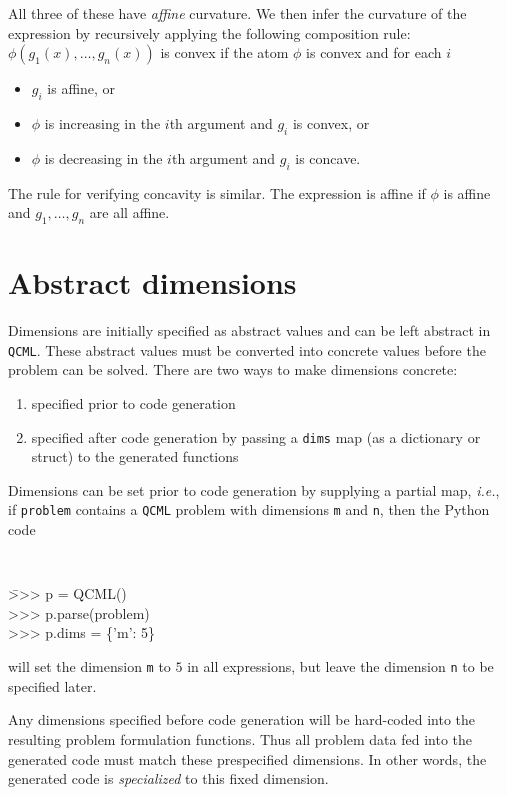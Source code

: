 \documentclass[11pt]{article}
\def\qcml{\texttt{QCML}\xspace}
\newcommand{\ie}{{\it i.e.}}
\begin{document}
All three of these have \emph{affine} curvature.
We then infer the curvature of the expression by recursively applying the
following composition rule:
$\phi(g_1(x),\ldots, g_n(x))$ is convex if the atom $\phi$ is convex and for each $i$
\begin{itemize}
  \item $g_i$ is affine, or
  \item $\phi$ is increasing in the $i$th argument and $g_i$ is convex, or
  \item $\phi$ is decreasing in the $i$th argument and $g_i$ is
concave.
\end{itemize}
The rule for verifying concavity is similar.  The expression is
affine if $\phi$ is affine and $g_1,\ldots, g_n$ are all affine.

\section{Abstract dimensions}
\label{s-abstract-dims}
Dimensions are initially specified as abstract values and can be left abstract
in \qcml. These abstract values must be converted into concrete values
before the problem can be solved. There are two ways to make dimensions
concrete:
\begin{enumerate}
\item specified prior to code generation
\item specified after code generation by passing a {\tt dims} map (as a
  dictionary or struct) to the generated functions %
\end{enumerate}

Dimensions can be set prior to code generation by supplying
a partial map, \ie, if {\tt problem} contains a \qcml problem with
dimensions \texttt{m} and \texttt{n}, then the Python code
{\tt
\begin{tabbing}
  \qquad \= >>> p = QCML() \\
  \> >>> p.parse(problem) \\
  \> >>> p.dims = \{'m': 5\}
\end{tabbing}
}
\noindent will set the dimension {\tt m} to $5$ in all expressions, but leave
the dimension {\tt n} to be specified later.

Any dimensions specified before code generation will be hard-coded into the
resulting problem formulation functions. Thus all problem data fed into the
generated code must match these prespecified dimensions. In other words, the
generated code is \emph{specialized} to this fixed dimension.
\end{document}
